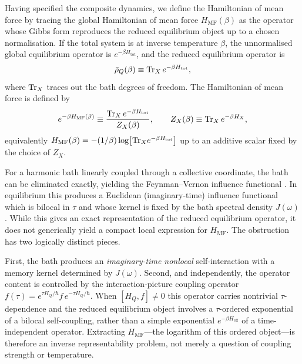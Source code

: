 Having specified the composite dynamics, we define the Hamiltonian of mean force by tracing the global
Hamiltonian of mean force $H_{\mathrm{MF}}(\beta)$ as the operator whose Gibbs
form reproduces the reduced equilibrium object up to a chosen normalisation. If
the total system is at inverse temperature $\beta$, the unnormalised global
equilibrium operator is $e^{-\beta H_{\mathrm{tot}}}$, and the reduced
equilibrium operator is
\begin{equation}
    \bar{\rho}_Q(\beta)\equiv \mathrm{Tr}_X\, e^{-\beta H_{\mathrm{tot}}} ,
    \label{eq:reduced_equilibrium_operator}
\end{equation}
where $\mathrm{Tr}_X$ traces out the bath degrees of freedom. The Hamiltonian of mean
force is defined by
\begin{equation}
    e^{-\beta H_{\mathrm{MF}}(\beta)}
    \equiv
    \frac{\mathrm{Tr}_X\, e^{-\beta H_{\mathrm{tot}}}}{Z_X(\beta)},
    \qquad
    Z_X(\beta)\equiv \mathrm{Tr}_X\, e^{-\beta H_X},
    \label{eq:HMF_def}
\end{equation}
equivalently
$H_{\mathrm{MF}}(\beta)=-(1/\beta)\log\!\big[\mathrm{Tr}_X e^{-\beta H_{\mathrm{tot}}}\big]$
up to an additive scalar fixed by the choice of $Z_X$.

For a harmonic bath linearly coupled through a collective coordinate, the bath
can be eliminated exactly, yielding the Feynman--Vernon influence functional
\cite{feynmanTheoryGeneralQuantum1963a,caldeiraQuantumTunnellingDissipative1983a,grabertQuantumBrownianMotion1988}.
In equilibrium this produces a Euclidean (imaginary-time) influence functional
which is bilocal in $\tau$ and whose kernel is fixed by the bath spectral
density $J(\omega)$. While this gives an exact representation of the reduced
equilibrium operator, it does not generically yield a compact local expression
for $H_{\mathrm{MF}}$. The obstruction has two logically distinct pieces.

First, the bath produces an \emph{imaginary-time nonlocal} self-interaction with
a memory kernel determined by $J(\omega)$. Second, and independently, the
operator content is controlled by the interaction-picture coupling operator
$f(\tau)=e^{\tau H_Q/\hbar} f\, e^{-\tau H_Q/\hbar}$. When $[H_Q,f]\neq 0$ this
operator carries nontrivial $\tau$-dependence and the reduced equilibrium object
involves a $\tau$-ordered exponential of a bilocal self-coupling, rather than a
simple exponential $e^{-\beta H_{\mathrm{eff}}}$ of a time-independent operator.
Extracting $H_{\mathrm{MF}}$---the logarithm of this ordered object---is
therefore an inverse representability problem, not merely a question of coupling
strength or temperature.

